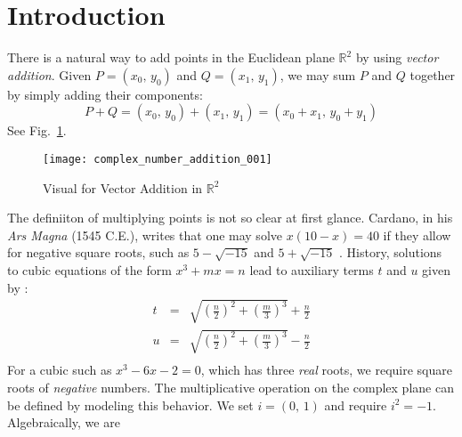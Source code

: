 \documentclass{article}
\theoremstyle{definition}
\begin{document}
    \section{Introduction}
        There is a natural way to add points in the Euclidean plane
        $\mathbb{R}^{2}$ by using \textit{vector addition}. Given
        $P=(x_{0},\,y_{0})$ and $Q=(x_{1},\,y_{1})$, we may sum $P$ and $Q$
        together by simply adding their components:
        \begin{equation}
            P+Q
            =(x_{0},\,y_{0})+(x_{1},\,y_{1})
            =(x_{0}+x_{1},\,y_{0}+y_{1})
        \end{equation}
        See Fig.~\ref{fig:complex_number_addition_001}.
        \begin{figure}
            \centering
            \texttt{[image: complex\_number\_addition\_001]}
            \caption{Visual for Vector Addition in $\mathbb{R}^{2}$}
            \label{fig:complex_number_addition_001}
        \end{figure}
        The definiiton of multiplying points is not so clear at first glance.
        Cardano, in his \textit{Ars Magna} (1545 C.E.), writes that
        one may solve $x(10-x)=40$ if they allow for negative square roots,
        such as $5-\sqrt{-15}$ and $5+\sqrt{-15}$
        \cite[p.~252]{KlineMathematicalHistory}.
        History, solutions to cubic equations of the form
        $x^{3}+mx=n$ lead to auxiliary terms $t$ and $u$ given by
        \cite[p.~264]{KlineMathematicalHistory}:
        \begin{equation}
            \begin{array}{rcl}
                \displaystyle
                t
                &=&
                \displaystyle
                \sqrt{\left(\frac{n}{2}\right)^{2}+\left(\frac{m}{3}\right)^{3}}
                +\frac{n}{2}\\[1.5em]
                \displaystyle
                u
                &=&
                \displaystyle
                \sqrt{\left(\frac{n}{2}\right)^{2}+\left(\frac{m}{3}\right)^{3}}
                -\frac{n}{2}\\
            \end{array}
        \end{equation}
        For a cubic such as $x^{3}-6x-2=0$, which has three \textit{real} roots,
        we require square roots of \textit{negative} numbers. The multiplicative
        operation on the complex plane can be defined by modeling this behavior.
        We set $i=(0,\,1)$ and require $i^{2}=-1$. Algebraically, we are
\end{document}
